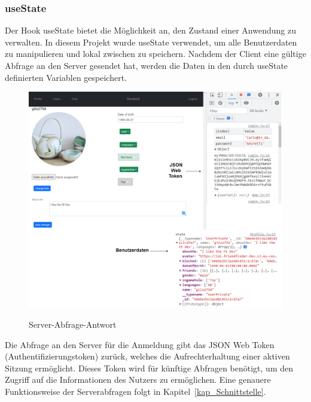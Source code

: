 \subsubsection*{useState}
Der Hook useState bietet die Möglichkeit an, den Zustand einer Anwendung zu verwalten. In diesem Projekt wurde useState verwendet, um alle Benutzerdaten zu manipulieren und lokal zwischen zu speichern. Nachdem der Client eine gültige Abfrage an den Server gesendet hat, werden die Daten in den durch useState definierten Variablen gespeichert.
\begin{figure}[h!]
  \centering
  \includegraphics[scale=0.35]{sources/Server-Abfrage-Antwort}
  \caption[Server-Abfrage-Antwort]{}
  \label{fig:Server-Abfrage-Antwort} 
  Server-Abfrage-Antwort
\end{figure}
Die Abfrage an den Server für die Anmeldung gibt das JSON Web Token\\(Authentifizierungstoken){\cite{RFC7519}} zurück, welches die Aufrechterhaltung einer aktiven Sitzung ermöglicht. Dieses Token wird für künftige Abfragen benötigt, um den Zugriff auf die Informationen des Nutzers zu ermöglichen. Eine genauere Funktionsweise der Serverabfragen folgt in Kapitel~\ref{kap_Schnittstelle}.
